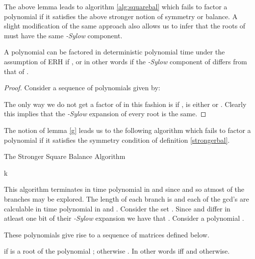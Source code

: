 The above lemma leads to algorithm \ref{alg:squarebal} which fails to factor a polynomial  if it satisfies the above stronger notion of symmetry or balance.
A slight modification of the same approach also allows us to infer that the roots of  must have the same \emph{-Sylow} component.

\begin{lemma}
	A polynomial  can be factored in deterministic polynomial time under the assumption of ERH if , or in other
	words if the \emph{-Sylow} component of  differs from that of .
\end{lemma}

\begin{proof}
	Consider a sequence of polynomials  given by:

	

	The only way we do not get a factor of  in this fashion is if ,  is either
	 or . Clearly this implies that the \emph{-Sylow} expansion of every root is the same.
\end{proof}

The notion of lemma \ref{g} leads us to the following algorithm which fails to factor a polynomial  if it satisfies the symmetry condition of definition \ref{strongerbal}.


\begin{algorithm}[H]
	\caption{The Stronger Square Balance Algorithm}
	\label{alg:squarebal}
\begin{algorithmic}
         \State  k   
	 \State  
	 \State  
 \If {} \State  \EndIf
 \If {} \State  \EndIf
 \For {}
	 \For {}
		  \State 
		  \State 
		  \If {} 
		      \If {} 
			\State  
		      \EndIf
		      \State  
		  \EndIf
		  \If {} 
		      \If {} 
		          \State 
		      \EndIf
		      \State  
		  \EndIf
	 \EndFor
\EndFor
\end{algorithmic}
\end{algorithm}

\vskip 1cm
This algorithm terminates in time polynomial in  and  since  and so atmost  of the branches may be explored. The length of each branch is  and
each of the gcd's are calculable in time polynomial in  and . Consider the set . Since  and  differ in atleast one bit of their \emph{-Sylow} expansion we have that
. Consider a polynomial .



These polynomials give rise to a sequence of  matrices  defined below.

\begin{definition}\label{matrixdef}
	 if  is a  root of the polynomial ; otherwise . In other words  iff   and  otherwise.
\end{definition}


